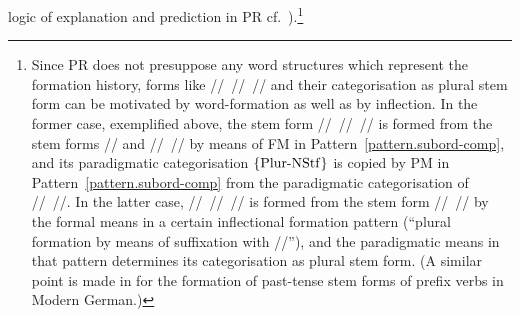 \documentclass[output=paper
  ,nobabel
  ,draftmode
  ,colorlinks, citecolor=brown
]{langscibook}
\begin{document}
logic of explanation and prediction in PR cf.\ \citealt{nolda:2018:explaining:linguistic}).\footnote{Since PR does not presuppose
any word structures which represent the formation history, forms like
// // // and their categorisation as plural stem form
can be motivated by word-formation as well as by inflection. In the former case,
exemplified above, the stem form // // // is formed from the stem forms // and // // by means of FM in Pattern \ref{pattern.subord-comp}, and its paradigmatic
categorisation $\left\{\smash{\operatorname{Plur-NStf}}\right\}$ is copied by PM in Pattern \ref{pattern.subord-comp} from the paradigmatic
categorisation of // //. In the latter case, // // // is formed from the stem form // // by the formal means in a certain
inflectional formation pattern (``plural formation by means of
suffixation with //''), and the paradigmatic means in that
pattern determines its categorisation as plural stem form. (A similar point is
made in \citet[369]{nolda:2019:wortbildung:flexion} for
the formation of past-tense stem forms of prefix verbs in Modern
German.)}
\end{document}
